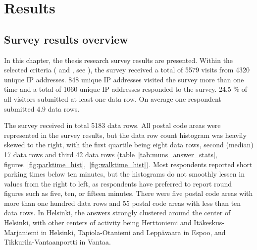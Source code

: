 \section{Results}
\label{sec:c4-results} %
\subsection{Survey results overview}
\justify

In this chapter, the thesis research survey results are presented. Within the selected criteria ( and , see \hyperref[sec:c3-processdata]{}), the survey received a total of 5579 visits from 4320 unique IP addresses. 848 unique IP addresses visited the survey more than one time and a total of 1060 unique IP addresses responded to the survey. 24.5 \% of all visitors submitted at least one data row. On average one respondent submitted 4.9 data rows.

The survey received in total 5183 data rows. All postal code areas were represented in the survey results, but the data row count histogram was heavily skewed to the right, with the first quartile being eight data rows, second (median) 17 data rows and third 42 data rows (table~\ref{tab:muns_answer_stats}, figures~\ref{fig:parktime_hist},~\ref{fig:walktime_hist}). Most respondents reported short parking times below ten minutes, but the histograms do not smoothly lessen in values from the right to left, as respondents have preferred to report round figures such as five, ten, or fifteen minutes. There were five postal code areas with more than one hundred data rows and 55 postal code areas with less than ten data rows. In Helsinki, the answers strongly clustered around the center of Helsinki, with other centers of activity being Herttoniemi and Itäkeskus-Marjaniemi in Helsinki, Tapiola-Otaniemi and Leppävaara in Espoo, and Tikkurila-Vantaanportti in Vantaa.

